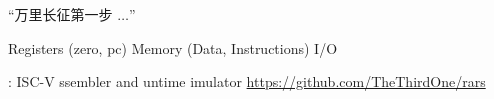 
\begin{frame}{}
  \begin{center}

    \vspace{0.50cm}
    ``万里长征第一步 $\ldots$''
  \end{center}
\end{frame}

\begin{frame}{}
\end{frame}

\begin{frame}{}
\end{frame}

\begin{frame}{}
  \begin{center}
    Registers (zero, pc) \quad Memory (Data, Instructions) \quad I/O
  \end{center}
\end{frame}

\begin{frame}{}
\end{frame}

\begin{frame}{}
  \begin{center}
    : ISC-V ssembler
      and untime imulator
    \url{https://github.com/TheThirdOne/rars}
  \end{center}
\end{frame}

\begin{frame}{}
  \begin{center}

    \pause
    \vspace{1.00cm}

    \pause
    \vspace{1.00cm}
  \end{center}
\end{frame}

